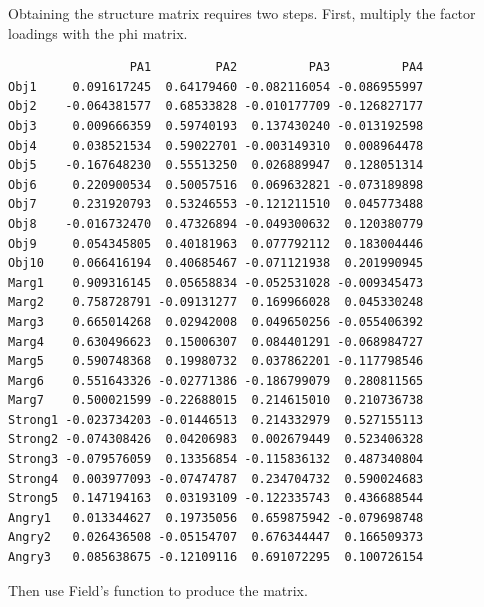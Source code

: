 \documentclass[
  english,
]{book}
\newenvironment{Shaded}{\begin{snugshade}}{\end{snugshade}}
\newcommand{\NormalTok}[1]{#1}
\newcommand{\OperatorTok}[1]{\textcolor[rgb]{0.81,0.36,0.00}{\textbf{#1}}}
\newcommand{\StringTok}[1]{\textcolor[rgb]{0.31,0.60,0.02}{#1}}
\begin{document}
Obtaining the structure matrix requires two steps. First, multiply the factor loadings with the phi matrix.

\begin{Shaded}
\end{Shaded}

\begin{verbatim}
                 PA1         PA2          PA3          PA4
Obj1     0.091617245  0.64179460 -0.082116054 -0.086955997
Obj2    -0.064381577  0.68533828 -0.010177709 -0.126827177
Obj3     0.009666359  0.59740193  0.137430240 -0.013192598
Obj4     0.038521534  0.59022701 -0.003149310  0.008964478
Obj5    -0.167648230  0.55513250  0.026889947  0.128051314
Obj6     0.220900534  0.50057516  0.069632821 -0.073189898
Obj7     0.231920793  0.53246553 -0.121211510  0.045773488
Obj8    -0.016732470  0.47326894 -0.049300632  0.120380779
Obj9     0.054345805  0.40181963  0.077792112  0.183004446
Obj10    0.066416194  0.40685467 -0.071121938  0.201990945
Marg1    0.909316145  0.05658834 -0.052531028 -0.009345473
Marg2    0.758728791 -0.09131277  0.169966028  0.045330248
Marg3    0.665014268  0.02942008  0.049650256 -0.055406392
Marg4    0.630496623  0.15006307  0.084401291 -0.068984727
Marg5    0.590748368  0.19980732  0.037862201 -0.117798546
Marg6    0.551643326 -0.02771386 -0.186799079  0.280811565
Marg7    0.500021599 -0.22688015  0.214615010  0.210736738
Strong1 -0.023734203 -0.01446513  0.214332979  0.527155113
Strong2 -0.074308426  0.04206983  0.002679449  0.523406328
Strong3 -0.079576059  0.13356854 -0.115836132  0.487340804
Strong4  0.003977093 -0.07474787  0.234704732  0.590024683
Strong5  0.147194163  0.03193109 -0.122335743  0.436688544
Angry1   0.013344627  0.19735056  0.659875942 -0.079698748
Angry2   0.026436508 -0.05154707  0.676344447  0.166509373
Angry3   0.085638675 -0.12109116  0.691072295  0.100726154
\end{verbatim}

Then use Field's \citeyearpar{field_discovering_2012} function to produce the matrix.
\end{document}
